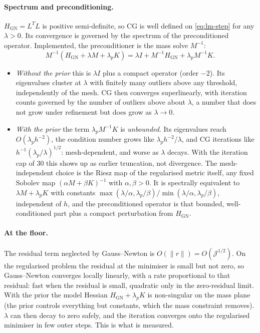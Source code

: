 \documentclass[11pt]{article}
\newcommand{\Jf}{\mathscr{J}}  %
\newcommand{\norm}[1]{\lVert #1 \rVert}
\begin{document}
\paragraph{Spectrum and preconditioning.} $H_{\mathrm{GN}} = L^TL$ is
positive semi-definite, so CG is well defined on
\eqref{eq:lm-step} for any $\lambda > 0$. Its convergence is governed by
the spectrum of the preconditioned operator. Implemented, the
preconditioner is the mass solve $M^{-1}$:
\begin{equation}
  M^{-1}(H_{\mathrm{GN}} + \lambda M + \lambda_pK)
  = \lambda I + M^{-1}H_{\mathrm{GN}} + \lambda_p M^{-1}K .
\end{equation}
\begin{itemize}
\item \emph{Without the prior} this is $\lambda I$ plus a compact operator
  (order $-2$). Its eigenvalues cluster at $\lambda$ with finitely many
  outliers above any threshold, independently of the mesh. CG then
  converges superlinearly, with iteration counts governed by the number of
  outliers above about $\lambda$, a number that does not grow under
  refinement but does grow as $\lambda\to0$.
\item \emph{With the prior} the term $\lambda_pM^{-1}K$ is
  \emph{unbounded}. Its eigenvalues reach $O(\lambda_ph^{-2})$, the
  condition number grows like $\lambda_ph^{-2}/\lambda$, and CG
  iterations like $h^{-1}(\lambda_p/\lambda)^{1/2}$: mesh-dependent, and
  worse as $\lambda$ decays. With the iteration cap of 30 this shows up as
  earlier truncation, not divergence. The mesh-independent choice is the
  Riesz map of the regularised metric itself, any fixed Sobolev map
  $(\alpha M + \beta K)^{-1}$ with $\alpha,\beta > 0$. It is spectrally
  equivalent to $\lambda M + \lambda_pK$ with constants
  $\max(\lambda/\alpha, \lambda_p/\beta)/\min(\lambda/\alpha,
  \lambda_p/\beta)$, independent of $h$, and the preconditioned operator
  is that bounded, well-conditioned part plus a compact perturbation from
  $H_{\mathrm{GN}}$.
\end{itemize}

\paragraph{At the floor.} The residual term neglected by Gauss--Newton is
$O(\norm{r}) = O(\Jf ^{1/2})$. On the regularised problem the residual at the
minimiser is small but not zero, so Gauss--Newton converges locally
linearly, with a rate proportional to that residual: fast when the
residual is small, quadratic only in the zero-residual limit. With the
prior the model Hessian $H_{\mathrm{GN}} + \lambda_pK$ is non-singular on
the mass plane (the prior controls everything but constants, which the
mass constraint removes). $\lambda$ can then decay to zero safely, and
the iteration converges onto the regularised minimiser in few outer
steps. This is what is measured.
\end{document}
